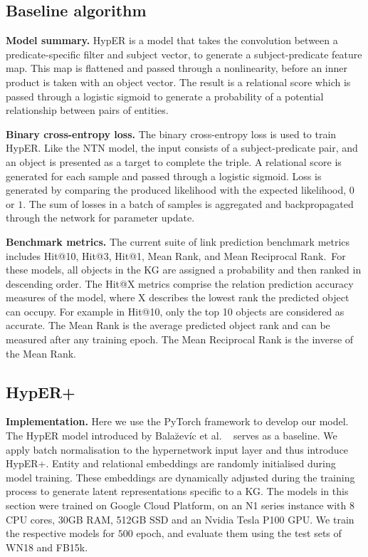 \subsection{Baseline algorithm}
\textbf{Model summary.} HypER is a model that takes the convolution between a predicate-specific filter and subject vector, to generate a subject-predicate feature map. This map is flattened and passed through a nonlinearity, before an inner product is taken with an object vector. The result is a relational score which is passed through a logistic sigmoid to generate a probability of a potential relationship between pairs of entities. \par

\noindent \textbf{Binary cross-entropy loss.} The binary cross-entropy loss is used to train HypER. Like the NTN model, the input consists of a subject-predicate pair, and an object is presented as a target to complete the triple. A relational score is generated for each sample and passed through a logistic sigmoid. Loss is generated by comparing the produced likelihood with the expected likelihood, $ 0 $ or $ 1 $. The sum of losses in a batch of samples is aggregated and backpropagated through the network for parameter update. \par

\noindent \textbf{Benchmark metrics.} The current suite of link prediction benchmark metrics includes Hit@10, Hit@3, Hit@1, Mean Rank, and Mean Reciprocal Rank.\ For these models, all objects in the KG are assigned a probability and then ranked in descending order. The Hit@X metrics comprise the relation prediction accuracy measures of the model, where X describes the lowest rank the predicted object can occupy. For example in Hit@10, only the top 10 objects are considered as accurate. The Mean Rank is the average predicted object rank and can be measured after any training epoch. The Mean Reciprocal Rank is the inverse of the Mean Rank. \par



\subsection{HypER+}

\textbf{Implementation.} Here we use the PyTorch framework to develop our model. The HypER model introduced by Bala\u{z}ev\'{i}c et al. \unskip ~\citep{balazevic2019hypernetwork} serves as a baseline. We apply batch normalisation to the hypernetwork input layer and thus introduce HypER+. Entity and relational embeddings are randomly initialised during model training. These embeddings are dynamically adjusted during the training process to generate latent representations specific to a KG. The models in this section were trained on Google Cloud Platform, on an N1 series instance with  8 CPU cores, 30GB RAM, 512GB SSD and an Nvidia Tesla P100 GPU. We train the respective models for $ 500 $ epoch, and evaluate them using the test sets of WN18 and FB15k. \par

